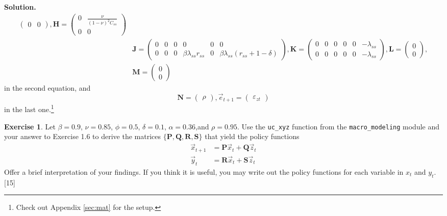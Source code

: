 \documentclass[11pt]{article}
\numberwithin{equation}{section} %
\numberwithin{figure}{section} %
\numberwithin{table}{section} %
\theoremstyle{definition}
\newtheorem{exercise}[theorem]{Exercise}
\newenvironment{solution}{\begin{addmargin}[2em]{0em} {\bf Solution. }}{\end{addmargin}}
\begin{document}
\begin{solution}
\begin{align*}
\begin{pmatrix}
            0 & 0
        \end{pmatrix}, \mathbf{H} = \begin{pmatrix}
            0 & \frac{\nu}{(1 - \nu)^2 C_{ss}} \\
            0 & 0
        \end{pmatrix} \\
        &\mathbf{J} = \begin{pmatrix}
            0 & 0 & 0 & 0 & 0 & 0 \\
            0 & 0 & 0 & \beta \lambda_{ss} r_{ss} & 0 & \beta \lambda_{ss} (r_{ss} + 1 - \delta)
        \end{pmatrix}, \mathbf{K} = \begin{pmatrix}
            0 & 0 & 0 & 0 & 0 & -\lambda_{ss} \\
            0 & 0 & 0 & 0 & 0 & -\lambda_{ss}
        \end{pmatrix}, \mathbf{L} = \begin{pmatrix}
            0 \\ 0
        \end{pmatrix}, \\
        &\mathbf{M} = \begin{pmatrix}
            0 \\ 0
        \end{pmatrix}
    \end{align*}
    in the second equation, and
    \[
        \mathbf{N} = \begin{pmatrix}
            \rho
        \end{pmatrix}, \vec{e}_{t+1} = \begin{pmatrix}
            \varepsilon_{zt}
        \end{pmatrix}
    \]
    in the last one.\footnote{Check out Appendix \ref{sec:mat} for the setup.}


\end{solution}


\begin{exercise}
    Let $\beta=0.9$, $\nu=0.85$, $\phi=0.5$, $\delta=0.1$, $\alpha=0.36$,and $\rho=0.95$. Use the \verb+uc_xyz+ function from the \verb+macro_modeling+ module and your answer to Exercise 1.6 to derive the matrices $\{\mathbf{P}, \mathbf{Q}, \mathbf{R}, \mathbf{S}\}$ that yield the policy functions
    \begin{align*}
        \vec{x}_{t+1} &= \mathbf{P} \vec{x}_t + \mathbf{Q} \vec{z}_t \\
        \vec{y}_t &= \mathbf{R} \vec{x}_t + \mathbf{S} \vec{z}_t 
    \end{align*}
    Offer a brief interpretation of your findings. If you think it is useful, you may write out the policy functions for each variable in $x_t$ and $y_t$. [15]
\end{exercise}
\end{document}
